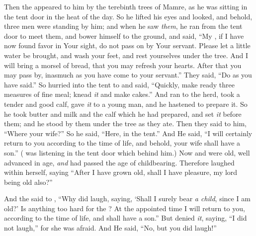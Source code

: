 
\bverse Then the \lord appeared to him by the terebinth trees of Mamre, as he was sitting in the tent door in the heat of the day.
\bverse So he lifted his eyes and looked, and behold, three men were standing by him; and when he saw \textit{them}, he ran from the tent door to meet them, and bower himself to the ground,
\bverse and said, ``My \lord, if I have now found favor in Your sight, do not pass on by Your servant.
\bverse Please let a little water be brought, and wash your feet, and rest yourselves under the tree.
\bverse And I will bring a morsel of bread, that you may refresh your hearts. After that you may pass by, inasmuch as you have come to your servant.'' They said, ``Do as you have said.''
\bverse So  hurried into the tent to  and said, ``Quickly, make ready three measures of fine meal; knead \textit{it} and make cakes.''
\bverse And  ran to the herd, took a tender and good calf, gave \textit{it} to a young man, and he hastened to prepare it.
\bverse So he took butter and milk and the calf which he had prepared, and set \textit{it} before them; and he stood by them under the tree as they ate. 
\bverse Then they said to him, ``Where \is {} your wife?'' So he said, ``Here, in the tent.''
\bverse And He said, ``I will certainly return to you according to the time of life, and behold,  your wife shall have a son.'' ( was listening in the tent door which \was behind him.)
\bverse Now  and  were old, well advanced in age, \textit{and}  had passed the age of childbearing.
\bverse Therefore  laughed within herself, saying ``After I have grown old, shall I have pleasure, my lord being old also?''

\bverse And the \lord said to , ``Why did  laugh, saying, `Shall I surely bear \textit{a child}, since I am old?'
\bverse Is anything too hard for the \lord? At the appointed time I will return to you, according to the time of life, and  shall have a son.''
\bverse But  denied \textit{it}, saying, ``I did not laugh,'' for she was afraid. And He said, ``No, but you did laugh!''


